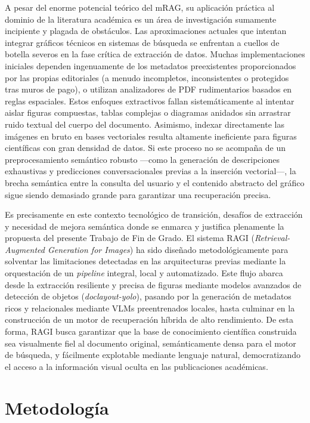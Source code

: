 \documentclass[a4paper]{report}
\begin{document}
A pesar del enorme potencial teórico del mRAG, su aplicación práctica al dominio de la literatura académica es un área de investigación sumamente incipiente y plagada de obstáculos. Las aproximaciones actuales que intentan integrar gráficos técnicos en sistemas de búsqueda se enfrentan a cuellos de botella severos en la fase crítica de extracción de datos. Muchas implementaciones iniciales dependen ingenuamente de los metadatos preexistentes proporcionados por las propias editoriales (a menudo incompletos, inconsistentes o protegidos tras muros de pago), o utilizan analizadores de PDF rudimentarios basados en reglas espaciales. Estos enfoques extractivos fallan sistemáticamente al intentar aislar figuras compuestas, tablas complejas o diagramas anidados sin arrastrar ruido textual del cuerpo del documento. Asimismo, indexar directamente las imágenes en bruto en bases vectoriales resulta altamente ineficiente para figuras científicas con gran densidad de datos. Si este proceso no se acompaña de un preprocesamiento semántico robusto —como la generación de descripciones exhaustivas y predicciones conversacionales previas a la inserción vectorial—, la brecha semántica entre la consulta del usuario y el contenido abstracto del gráfico sigue siendo demasiado grande para garantizar una recuperación precisa.

Es precisamente en este contexto tecnológico de transición, desafíos de extracción y necesidad de mejora semántica donde se enmarca y justifica plenamente la propuesta del presente Trabajo de Fin de Grado. El sistema RAGI (\textit{Retrieval-Augmented Generation for Images}) ha sido diseñado metodológicamente para solventar las limitaciones detectadas en las arquitecturas previas mediante la orquestación de un \textit{pipeline} integral, local y automatizado. Este flujo abarca desde la extracción resiliente y precisa de figuras mediante modelos avanzados de detección de objetos (\textit{doclayout-yolo}), pasando por la generación de metadatos ricos y relacionales mediante VLMs preentrenados locales, hasta culminar en la construcción de un motor de recuperación híbrida de alto rendimiento. De esta forma, RAGI busca garantizar que la base de conocimiento científica construida sea visualmente fiel al documento original, semánticamente densa para el motor de búsqueda, y fácilmente explotable mediante lenguaje natural, democratizando el acceso a la información visual oculta en las publicaciones académicas.


\chapter{Metodología}
\end{document}
